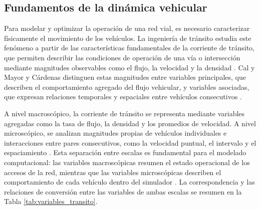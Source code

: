\subsection{Fundamentos de la dinámica vehicular}\label{subsec:fundamentos_dinamica_vehicular}

Para modelar y optimizar la operación de una red vial, es necesario caracterizar físicamente el movimiento de los vehículos. La ingeniería de tránsito estudia este fenómeno a partir de las características fundamentales de la corriente de tránsito, que permiten describir las condiciones de operación de una vía o intersección mediante magnitudes observables como el flujo, la velocidad y la densidad \cite{ite_handbook}. Cal y Mayor y Cárdenas distinguen estas magnitudes entre variables principales, que describen el comportamiento agregado del flujo vehicular, y variables asociadas, que expresan relaciones temporales y espaciales entre vehículos consecutivos \cite{calymayor}.

A nivel macroscópico, la corriente de tránsito se representa mediante variables agregadas como la tasa de flujo, la densidad y los promedios de velocidad. A nivel microscópico, se analizan magnitudes propias de vehículos individuales e interacciones entre pares consecutivos, como la velocidad puntual, el intervalo y el espaciamiento \cite{calymayor}. Esta separación entre escalas es fundamental para el modelado computacional: las variables macroscópicas resumen el estado operacional de los accesos de la red, mientras que las variables microscópicas describen el comportamiento de cada vehículo dentro del simulador \cite{fernandez}. La correspondencia y las relaciones de conversión entre las variables de ambas escalas se resumen en la Tabla \ref{tab:variables_transito}.

